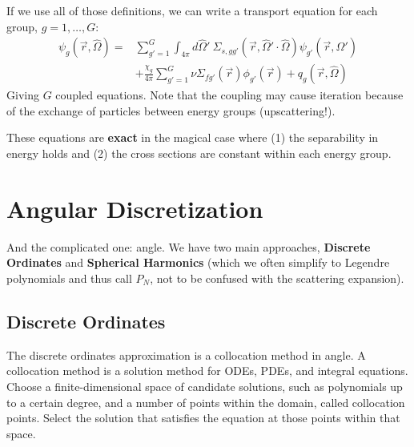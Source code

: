\documentclass[12pt]{article}
\newcommand{\vOmega}{\ensuremath{\hat{\Omega}}}
\begin{document}
If we use all of those definitions, we can write a transport equation for each group, $g = 1,\dots, G$:
\begin{align*}
[\vOmega \cdot \nabla + \Sigma_{tg}(\vec{r})]\psi_g(\vec{r}, \vOmega) =&  
\sum_{g'=1}^G \int_{4 \pi} d\vOmega'\: \Sigma_{s,gg'}(\vec{r}, \vOmega' \cdot \vOmega) \psi_{g'}(\vec{r}, \vOmega')\\
&+\frac{\chi_g}{4 \pi}\sum_{g'=1}^G \nu\Sigma_{fg'}(\vec{r}) \phi_{g'}(\vec{r}) + q_g(\vec{r}, \vOmega)
\end{align*}
Giving $G$ coupled equations. Note that the coupling may cause iteration because of the exchange of particles between energy groups (upscattering!). 

These equations are \textbf{exact} in the magical case where (1) the separability in energy holds and (2) the cross sections are constant within each energy group. 


\section*{Angular Discretization}
And the complicated one: angle. We have two main approaches, \textbf{Discrete Ordinates} and \textbf{Spherical Harmonics} (which we often simplify to Legendre polynomials and thus call $P_N$, not to be confused with the scattering expansion).

\subsection*{Discrete Ordinates}
The discrete ordinates approximation is a collocation method in angle. A collocation method is a solution method for ODEs, PDEs, and integral equations. Choose a finite-dimensional space of candidate solutions, such as polynomials up to a certain degree, and a number of points within the domain, called collocation points. Select the solution that satisfies the equation at those points within that space. 
\end{document}
